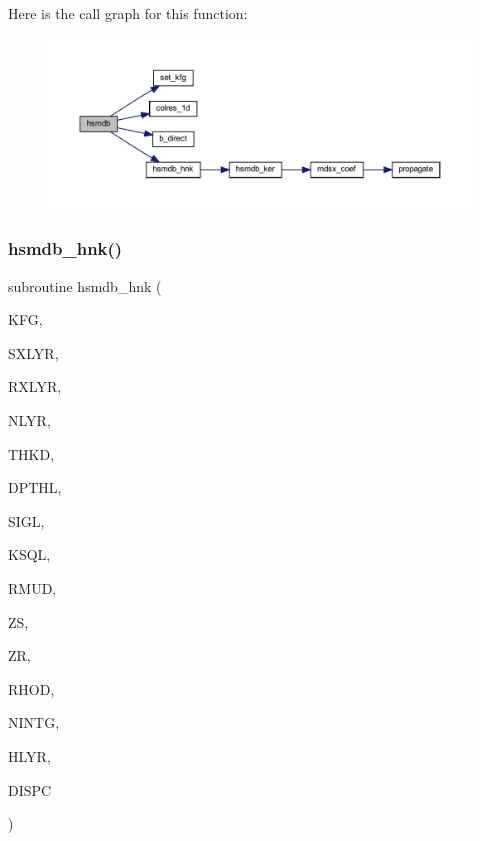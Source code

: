 Here is the call graph for this function\+:\nopagebreak
\begin{figure}[H]
\begin{center}
\leavevmode
\includegraphics[width=350pt]{Leroi__c_8f90_a48d6fa7ecaca60caaf9ecba957eaa3b1_cgraph}
\end{center}
\end{figure}
\mbox{\label{Leroi__c_8f90_a5f1c5171e9808d392bd660bf9b9ed928}} 
\subsubsection{\texorpdfstring{hsmdb\+\_\+hnk()}{hsmdb\_hnk()}}
{\footnotesize\ttfamily subroutine hsmdb\+\_\+hnk (\begin{DoxyParamCaption}\item[{integer}]{K\+FG,  }\item[{integer}]{S\+X\+L\+YR,  }\item[{integer}]{R\+X\+L\+YR,  }\item[{integer}]{N\+L\+YR,  }\item[{real(kind=ql), dimension(nlyr)}]{T\+H\+KD,  }\item[{real(kind=ql), dimension(nlyr)}]{D\+P\+T\+HL,  }\item[{complex(kind=ql), dimension(nlyr)}]{S\+I\+GL,  }\item[{complex(kind=ql), dimension(nlyr)}]{K\+S\+QL,  }\item[{real(kind=ql), dimension(0\+:nlyr)}]{R\+M\+UD,  }\item[{real(kind=ql)}]{ZS,  }\item[{real(kind=ql)}]{ZR,  }\item[{real(kind=ql)}]{R\+H\+OD,  }\item[{integer}]{N\+I\+N\+TG,  }\item[{complex(kind=ql), dimension(nintg)}]{H\+L\+YR,  }\item[{complex(kind=ql)}]{D\+I\+S\+PC }\end{DoxyParamCaption})}

